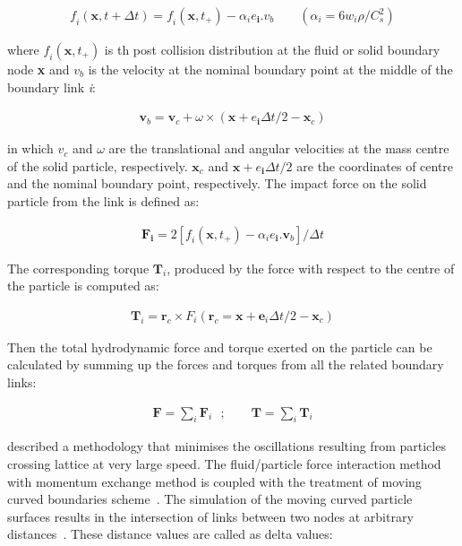 \begin{align}
\mathit{f_i}(\mathbf{x}, t + \Delta t)=\mathit{f_i}(\mathbf{x}, t_{+}) - 
\alpha_{\mathit{i}}\mathbf{\mathit{e}_i}.\mathbf{\mathit{v}}_{b} \qquad 
(\alpha_{i}=6\mathit{w_i}\rho/\mathit{C}_{\mathit{s}}^{2})
\end{align}

where $\mathit{f_i}(\mathbf{x}, t_{+})$ is th post collision distribution at 
the fluid or solid boundary node \textbf{x} and $\mathit{v}_{b}$ is the 
velocity at the nominal boundary point at the middle of the boundary link 
\textit{i}:

\begin{align}
\mathbf{v}_{b}=\mathbf{v}_{c}+\omega \times 
(\mathbf{x}+\mathbf{\mathit{e}_i}\Delta t /2 - \mathbf{x}_{c})
\end{align}

in which $\mathbf{\mathit{v}}_{c}$ and $\omega$ are the translational and 
angular velocities at the mass centre of the solid particle, respectively. 
$\mathbf{x}_{c}$ and $\mathbf{x}+\mathbf{\mathit{e}_i}\Delta t /2$ are the 
coordinates of centre and the nominal boundary point,  respectively. The impact 
force on the solid particle from the link is defined as:

\begin{align}
\mathbf{F_i}=2[\mathit{f_i} (\mathbf{x}, t_{+}) 
-\alpha_{\mathit{i}}\mathbf{\mathit{e}_i}.\mathbf{v}_{b}]/ \Delta t
\end{align} 

The corresponding torque $\mathbf{T}_{\mathit{i}}$, produced by the force with 
respect to the centre of the particle is computed as:

\begin{align}
\mathbf{T}_{\mathit{i}}=\mathbf{r}_{c} \times \mathit{F_i} 
(\mathbf{r}_{c}=\mathbf{x}+\mathbf{e}_{\mathit{i}} \Delta t /2 - \mathbf{x}_{c})
\end{align}

Then the total hydrodynamic force and torque exerted on the particle can be 
calculated by summing up the forces and torques from all the related boundary 
links:

\begin{align}
\mathbf{F} = \sum\limits_{\mathit{i}}{\mathbf{F}_{\mathit{i}}} \mbox{ }; \qquad 
\mathbf{T} = \sum\limits_{\mathit{i}}{\mathbf{T}_{\mathit{i}}}
\end{align}

\citet{Ladd2001} described a methodology that minimises the oscillations 
resulting from particles crossing lattice at very large speed. The 
fluid/particle force interaction method with momentum exchange method is 
coupled with the treatment of moving curved boundaries scheme~\citep{Yu2003}. 
The simulation of the moving curved particle surfaces results in the 
intersection of links between two nodes at arbitrary 
distances~\citep{Iglberger2008}. These distance values are called as delta 
values:

